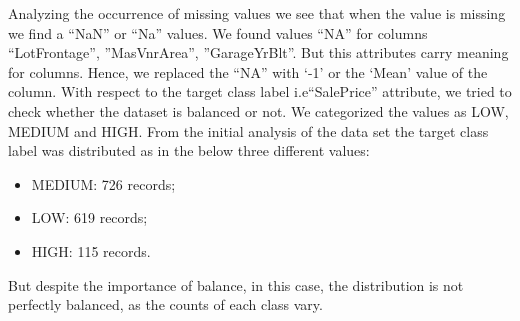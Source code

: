 Analyzing the occurrence of missing values we see that when the value is missing we find a “NaN” or “Na” values. We found values “NA” for columns “LotFrontage”, ”MasVnrArea”, ”GarageYrBlt”. But this attributes carry meaning for columns. Hence, we replaced the “NA” with ‘-1’ or the ‘Mean’ value of the column.  
With respect to the target class label i.e“SalePrice” attribute, we tried to check whether the dataset is balanced or not. We categorized the values as LOW, MEDIUM and HIGH. From the initial analysis of the data set the target class label was distributed as in the below three different values:
\begin{itemize}
    \item MEDIUM: 726 records;
    \item LOW: 619 records;
    \item HIGH: 115 records.
\end{itemize}
But despite the importance of balance, in this case, the distribution is not perfectly balanced, as the counts of each class vary.